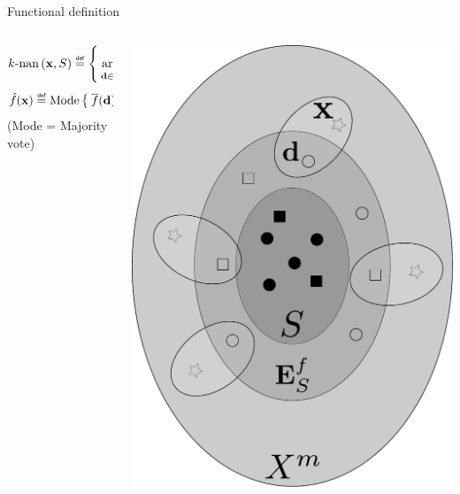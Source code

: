 \documentclass{beamer}
\begin{document}
\begin{frame}{Functional definition}
  \begin{columns}
    \begin{column}{.6\textwidth}
      $$
      k\text{-nan}\left(\mathbf{x}, S\right) \eqdef \Set{\argmin_{\mathbf{d} \in
      A_E^Y(S)}^k
      \delta(\mathbf{x},\mathbf{d})}
      $$
      $$\hat{f}(\mathbf{x}) \eqdef \text{Mode}\Set{\albl{\mathbf{d}} | \mathbf{d}
      \in k\text{-nan}\left(\mathbf{x}, S\right)}
      $$
      (Mode = Majority vote)
    \end{column}
    \begin{column}{.4\textwidth}
      \begin{center}
        \includegraphics[width=.9\textwidth]{figures/extended_classifier_pres.pdf}
      \end{center}
    \end{column}
  \end{columns}
\end{frame}
\end{document}
